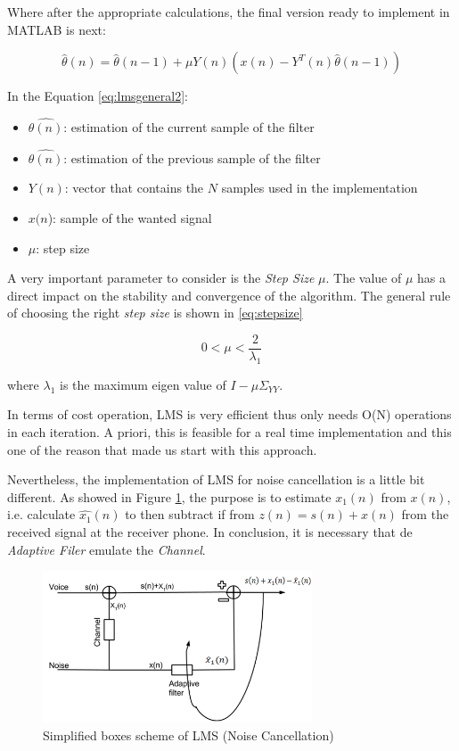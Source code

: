 \documentclass[11pt,a4paper,english]{book}  %
\theoremstyle{definition}  %
\theoremstyle{plain}  %
\theoremstyle{remark}  %
\begin{document}
	Where after the appropriate calculations, the final version ready to implement in MATLAB is next:
	
	\begin{equation}
	\label{eq:lmsgeneral2}
		\hat{\theta}(n) = \hat{\theta}(n-1) + \mu Y(n)(x(n)-Y^{T}(n)\hat{\theta}(n-1))
	\end{equation}
	
	In the Equation \ref{eq:lmsgeneral2}:
	
	\begin{itemize}
	\item $\hat{\theta(n)}$: estimation of the current sample of the filter
	\item $\hat{\theta(n)}$: estimation of the previous sample of the filter
	\item $Y(n)$: vector that contains the $N$ samples used in the implementation
	\item $x(n$): sample of the wanted signal
	\item $\mu$: step size
	\end{itemize}
	
	A very important parameter to consider is the \textit{Step Size} $\mu$. The value of $\mu$ has a direct impact on the stability and convergence of the algorithm. The general rule of choosing the right \textit{step size} is shown in \ref{eq:stepsize}
	
	\begin{equation}
	\label{lmsmu}
	0 < \mu <\frac{2}{\lambda_{1}} 
	\end{equation}
	
	where $\lambda_{1}$ is the maximum eigen value of $I-\mu \Sigma_{YY}$.
	
	In terms of cost operation, LMS is very efficient thus only needs O(N) operations in each iteration. A priori, this is feasible for a real time implementation and this one of the reason that made us start with this approach.
	
	Nevertheless, the implementation of LMS for noise cancellation is a little bit different. As showed in Figure \ref{fig:simplms}, the purpose is to estimate $x_{1}(n)$ from $x(n)$, i.e. calculate $\hat{x_{1}}(n)$ to then subtract if from $z(n)=s(n)+x(n)$ from the received signal at the receiver phone. In conclusion, it is necessary that de \textit{Adaptive Filer} emulate the \textit{Channel}.
	
		\begin{figure}[h]
		\centering
		\includegraphics[width=8cm]{images/theory/SimplifiedLMS.jpg}
		\caption{Simplified boxes scheme of LMS (Noise Cancellation)}
		\label{fig:simplms}
		\end{figure}
		
\end{document}
